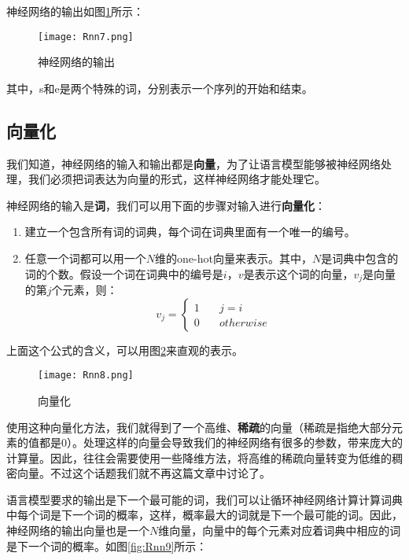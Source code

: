 神经网络的输出如图\ref{fig:Rnn7}所示：
\begin{figure}[!h]
	\centering
	\texttt{[image: Rnn7.png]}
	\caption{神经网络的输出}
	\label{fig:Rnn7}
\end{figure}

其中，s和e是两个特殊的词，分别表示一个序列的开始和结束。

\subsection{向量化}\label{Rnn:10}

我们知道，神经网络的输入和输出都是\textbf{向量}，为了让语言模型能够被神经网络处理，我们必须把词表达为向量的形式，这样神经网络才能处理它。

神经网络的输入是\textbf{词}，我们可以用下面的步骤对输入进行\textbf{向量化}：

\begin{enumerate}
	\item
	      建立一个包含所有词的词典，每个词在词典里面有一个唯一的编号。
	\item
	      任意一个词都可以用一个$N$维的one-hot向量来表示。其中，$N$是词典中包含的词的个数。假设一个词在词典中的编号是$i$，$v$是表示这个词的向量，\(v_j\)是向量的第$j$个元素，则：
	      \begin{equation*}
		      v_j=\left\{
		      \begin{aligned}
			      1 & \quad j=i       \\
			      0 & \quad otherwise
		      \end{aligned}
		      \right.
	      \end{equation*}
\end{enumerate}


上面这个公式的含义，可以用图\ref{fig:Rnn8}来直观的表示。
\begin{figure}[!h]
	\centering
	\texttt{[image: Rnn8.png]}
	\caption{向量化}
	\label{fig:Rnn8}
\end{figure}
使用这种向量化方法，我们就得到了一个高维、\textbf{稀疏}的向量（稀疏是指绝大部分元素的值都是0）。处理这样的向量会导致我们的神经网络有很多的参数，带来庞大的计算量。因此，往往会需要使用一些降维方法，将高维的稀疏向量转变为低维的稠密向量。不过这个话题我们就不再这篇文章中讨论了。

语言模型要求的输出是下一个最可能的词，我们可以让循环神经网络计算计算词典中每个词是下一个词的概率，这样，概率最大的词就是下一个最可能的词。因此，神经网络的输出向量也是一个$N$维向量，向量中的每个元素对应着词典中相应的词是下一个词的概率。如图\ref{fig:Rnn9}所示：

